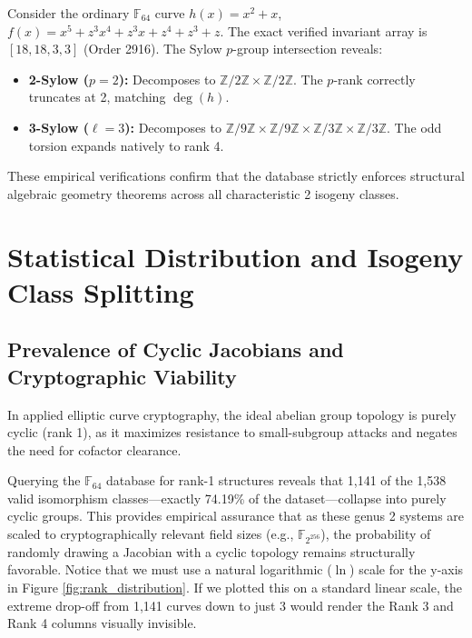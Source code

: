 \documentclass[letterpaper, 11pt]{article}
\begin{document}
Consider the ordinary $\mathbb{F}_{64}$ curve $h(x) = x^2 + x$, $f(x) = x^5 + z^3x^4 + z^3x + z^4 + z^3 + z$. The exact verified invariant array is $[18, 18, 3, 3]$ (Order 2916). The Sylow $p$-group intersection reveals:
\begin{itemize}
    \item \textbf{2-Sylow ($p=2$):} Decomposes to $\mathbb{Z}/2\mathbb{Z} \times \mathbb{Z}/2\mathbb{Z}$. The $p$-rank correctly truncates at 2, matching $\deg(h)$.
    \item \textbf{3-Sylow ($\ell = 3$):} Decomposes to $\mathbb{Z}/9\mathbb{Z} \times \mathbb{Z}/9\mathbb{Z} \times \mathbb{Z}/3\mathbb{Z} \times \mathbb{Z}/3\mathbb{Z}$. The odd torsion expands natively to rank 4.
\end{itemize}
These empirical verifications confirm that the database strictly enforces structural algebraic geometry theorems across all characteristic 2 isogeny classes.

\section{Statistical Distribution and Isogeny Class Splitting}

\subsection{Prevalence of Cyclic Jacobians and Cryptographic Viability}
In applied elliptic curve cryptography, the ideal abelian group topology is purely cyclic (rank 1), as it maximizes resistance to small-subgroup attacks and negates the need for cofactor clearance. 

Querying the $\mathbb{F}_{64}$ database for rank-1 structures reveals that 1,141 of the 1,538 valid isomorphism classes---exactly 74.19\% of the dataset---collapse into purely cyclic groups. This provides empirical assurance that as these genus 2 systems are scaled to cryptographically relevant field sizes (e.g., $\mathbb{F}_{2^{256}}$), the probability of randomly drawing a Jacobian with a cyclic topology remains structurally favorable. Notice that we must use a natural logarithmic ($\ln$) scale for the y-axis in Figure \ref{fig:rank_distribution}. If we plotted this on a standard linear scale, the extreme drop-off from 1,141 curves down to just 3 would render the Rank 3 and Rank 4 columns visually invisible.
\end{document}
